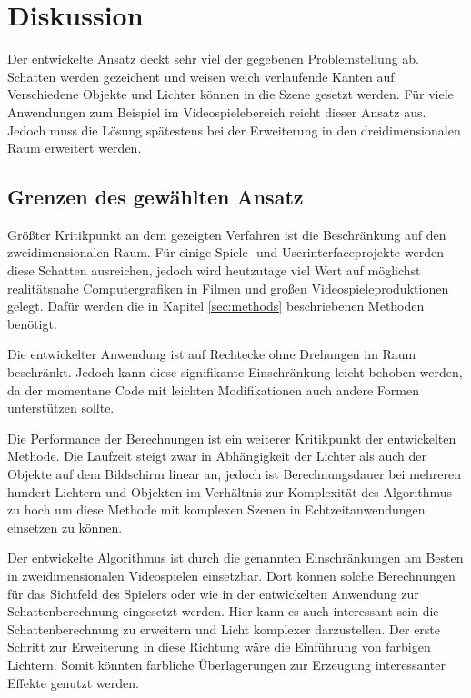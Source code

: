 \section{Diskussion}

Der entwickelte Ansatz deckt sehr viel der gegebenen Problemstellung ab. Schatten werden gezeichent
und weisen weich verlaufende Kanten auf. Verschiedene Objekte und Lichter können in die Szene gesetzt
werden. Für viele Anwendungen zum Beispiel im Videospielebereich reicht dieser Ansatz aus. Jedoch
muss die Lösung spätestens bei der Erweiterung in den dreidimensionalen Raum erweitert werden.

\subsection{Grenzen des gewählten Ansatz}

Größter Kritikpunkt an dem gezeigten Verfahren ist die Beschränkung auf den zweidimensionalen Raum.
Für einige Spiele- und Userinterfaceprojekte werden diese Schatten ausreichen, jedoch wird heutzutage
viel Wert auf möglichst realitätsnahe Computergrafiken in Filmen und großen Videospieleproduktionen
gelegt. Dafür werden die in Kapitel \ref{sec:methods} beschriebenen Methoden benötigt.

Die entwickelter Anwendung ist auf Rechtecke ohne Drehungen im Raum beschränkt. Jedoch kann diese
signifikante Einschränkung leicht behoben werden, da der momentane Code mit leichten Modifikationen
auch andere Formen unterstützen sollte.

Die Performance der Berechnungen ist ein weiterer Kritikpunkt der entwickelten Methode. Die Laufzeit
steigt zwar in Abhängigkeit der Lichter als auch der Objekte auf dem Bildschirm linear an, jedoch
ist Berechnungsdauer bei mehreren hundert Lichtern und Objekten im Verhältnis zur Komplexität des
Algorithmus zu hoch um diese Methode mit komplexen Szenen in Echtzeitanwendungen einsetzen zu können.

Der entwickelte Algorithmus ist durch die genannten Einschränkungen am Besten in zweidimensionalen
Videospielen einsetzbar. Dort können solche Berechnungen für das Sichtfeld des Spielers oder wie in
der entwickelten Anwendung zur Schattenberechnung eingesetzt werden. Hier kann es auch interessant
sein die Schattenberechnung zu erweitern und Licht komplexer darzustellen. Der erste Schritt zur
Erweiterung in diese Richtung wäre die Einführung von farbigen Lichtern. Somit könnten farbliche
Überlagerungen zur Erzeugung interessanter Effekte genutzt werden.

